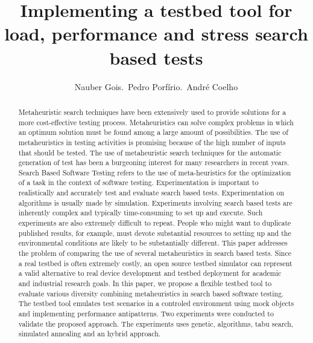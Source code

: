 \documentclass[times]{stvrauth}
\begin{document}

\title{Implementing a testbed tool for load, performance and stress search based tests}

\author{Nauber Gois.~Pedro Porfírio.~André Coelho}

\address{Universidade de Fortaleza, UNIFOR, Av. Washington Soares, 1321 - Edson Queiroz, Fortaleza - CE, 60811-905, Brasil}


\begin{abstract}
Metaheuristic search techniques have been extensively used to provide solutions for a more cost-effective testing process. Metaheuristics can solve complex problems in which an optimum solution must be found among a large amount of possibilities. The use of metaheuristics in testing activities is promising because of the high number of inputs that should be
tested. The use of metaheuristic search techniques for the automatic generation
of test  has been a burgeoning interest for many researchers in recent years. Search Based Software Testing refers to the use of meta-heuristics for the optimization of a task in the context of
software testing. Experimentation is important to realistically and accurately
test and evaluate search based tests. Experimentation
on algorithms is usually made by simulation. Experiments involving search based tests are inherently complex and typically time-consuming to set up and
execute. Such experiments are also extremely difficult to
repeat. People who might want to duplicate published results, for example, must devote substantial resources to setting up and the environmental conditions are likely to be substantially different. This paper addresses the problem of comparing the use of several metaheuristics in search based tests. Since a real testbed is often extremely costly, an open source testbed simulator can represent a valid alternative to real device development and testbed deployment for academic and industrial research goals. In this paper, we propose a flexible testbed tool to evaluate various diversity combining metaheuristics in search based software testing. The testbed tool emulates test scenarios in a controled environment using mock objects and implementing performance antipatterns. Two experiments were conducted to validate the proposed approach. The experiments uses genetic, algorithms, tabu search, simulated annealing and an hybrid approach.
\end{abstract}
\end{document}
